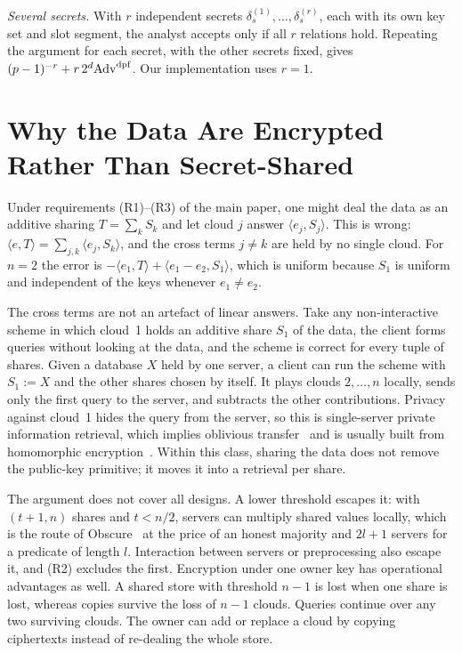\documentclass[10pt,journal,compsoc]{IEEEtran}
\begin{document}
\emph{Several secrets.} With $r$ independent secrets
$\delta_s^{(1)},\dots,\delta_s^{(r)}$, each with its own key set and slot
segment, the analyst accepts only if all $r$ relations hold. Repeating the
argument for each secret, with the other secrets fixed, gives
$(p-1)^{-r}+r\,2^d\mathrm{Adv}^{\mathrm{dpf}}$. Our implementation uses $r=1$.

\section{Why the Data Are Encrypted Rather Than Secret-Shared}

Under requirements (R1)--(R3) of the main paper, one might deal the data as an
additive sharing $T=\sum_kS_k$ and let cloud $j$ answer
$\langle e_j,S_j\rangle$. This is wrong: $\langle e,T\rangle=\sum_{j,k}\langle
e_j,S_k\rangle$, and the cross terms $j\neq k$ are held by no single cloud.
For $n=2$ the error is $-\langle e_1,T\rangle+\langle e_1-e_2,S_1\rangle$,
which is uniform because $S_1$ is uniform and independent of the keys whenever
$e_1\neq e_2$.

The cross terms are not an artefact of linear answers. Take any
non-interactive scheme in which cloud~1 holds an additive share $S_1$ of the
data, the client forms queries without looking at the data, and the scheme is
correct for every tuple of shares. Given a database $X$ held by one server, a
client can run the scheme with $S_1:=X$ and the other shares chosen by itself.
It plays clouds $2,\dots,n$ locally, sends only the first query to the server,
and subtracts the other contributions. Privacy against cloud~1 hides the query
from the server, so this is single-server private information retrieval, which
implies oblivious transfer~\cite{dicrescenzo2000single} and is usually built
from homomorphic encryption~\cite{kushilevitz1997replication}. Within this
class, sharing the data does not remove the public-key primitive; it moves it
into a retrieval per share.

The argument does not cover all designs. A lower threshold escapes it: with
$(t{+}1,n)$ shares and $t<n/2$, servers can multiply shared values locally,
which is the route of Obscure~\cite{gupta2020obscure} at the price of an
honest majority and $2l+1$ servers for a predicate of length $l$. Interaction
between servers or preprocessing also escape it, and (R2) excludes the first.
Encryption under one owner key has operational advantages as well. A shared
store with threshold $n-1$ is lost when one share is lost, whereas copies
survive the loss of $n-1$ clouds. Queries continue over any two surviving
clouds. The owner can add or replace a cloud by copying ciphertexts instead of
re-dealing the whole store.
\end{document}
